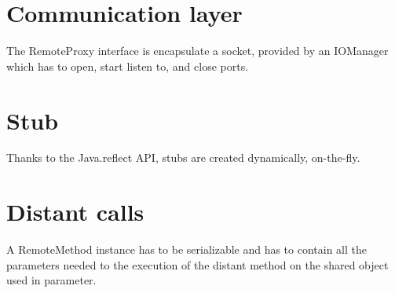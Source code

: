 \section{Communication layer}
The RemoteProxy interface is encapsulate a socket, provided by an IOManager which has to open, start listen to, and close ports.

\section{Stub}
Thanks to the Java.reflect API, stubs are created dynamically, on-the-fly.

\section{Distant calls}
A RemoteMethod instance has to be serializable and has to contain all the parameters needed to the execution of the distant method on the shared object used in parameter.


